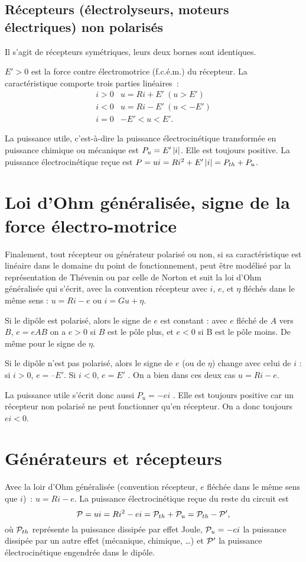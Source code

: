 \subsection{Récepteurs (électrolyseurs, moteurs électriques) non polarisés}
Il s'agit de récepteurs symétriques, leurs deux bornes sont identiques. 

$E' > 0$ est la force contre électromotrice (f.c.é.m.) du récepteur. La caractéristique comporte trois parties linéaires~:
\begin{align}
i > 0 & u = R i + E' \ (u > E') \\
i < 0 & u  = R i - E' \ (u < -E') \\
i = 0 &  - E' < u < E'.
\end{align}

La puissance utile, c'est-à-dire la puissance électrocinétique transformée en puissance chimique ou mécanique est $P_u = E' \abs{i}$. Elle est toujours positive. La puissance électrocinétique reçue est $P = u i = R i^2 + E' \abs{i} = P_{th} + P_u$.

\section{Loi d'Ohm généralisée, signe de la force électro-motrice}
Finalement, tout récepteur ou générateur polarisé ou non, si sa caractéristique est linéaire dans le domaine du point de fonctionnement, peut être modélisé par la représentation de Thévenin ou par celle de Norton et suit la loi d'Ohm généralisée qui s'écrit, avec la convention récepteur avec $i$, $e$, et $\eta$ fléchés dans le même sens : $u = R i - e$ ou $i = G u + \eta$.

Si le dipôle est polarisé, alors le signe de $e$ est constant : avec $e$ fléché de $A$ vers $B$, $e = eAB$ on a $e > 0$ si $B$ est le pôle plus, et $e < 0$ si B est le pôle moins. De même pour le signe de $\eta$.

Si le dipôle n'est pas polarisé, alors le signe de $e$ (ou de $\eta$) change avec celui de $i$ : si $i > 0$, $e = –E'$. Si $i < 0$, $e = E'$ . On a bien dans ces deux cas $u = R i - e$.

La puissance utile s'écrit donc aussi $P_u = - e i$ . Elle est toujours positive car un récepteur non polarisé ne peut fonctionner qu'en récepteur. On a donc toujours $ei < 0$.

\section{Générateurs et récepteurs}
Avec la loir d'Ohm généralisée (convention récepteur, $e$ fléchée dans le même sens que $i$)~: $u=Ri-e$. La puissance électrocinétique reçue du reste du circuit est 
\begin{equation}
	\P = ui = Ri^2 - ei = \P_{th}+ \P_u = \P_{th} - \P', 
\end{equation}
où $\P_{th}$ représente la puissance dissipée par effet Joule, $\P_u=-ei$ la puissance dissipée par un autre effet (mécanique, chimique, \ldots{}) et $\P'$ la puissance électrocinétique engendrée dans le dipôle.

